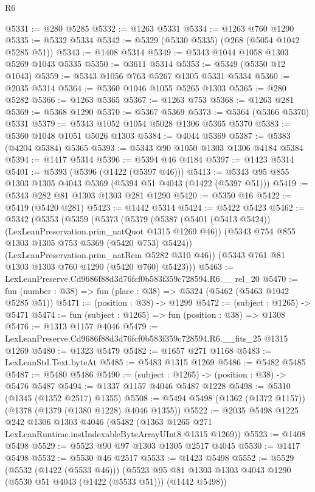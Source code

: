 \begin{lexlean}{R6}
\begin{coremodule}
@5331 := @280 @5285
@5332 := @1263 @5331
@5334 := @1263 @760 @1290
@5335 := @5332 @5334
@5342 := @5329 (@5330 @5335) (@268 (@5054 @1042 @5285 @51))
@5343 := @1408 @5314
@5349 := @5343 @1044 @1058 @1303 @5269 @1043 @5335
@5350 := @3611 @5314
@5353 := @5349 (@5350 @12 @1043)
@5359 := @5343 @1056 @763 @5267 @1305 @5331 @5334
@5360 := @2035 @5314
@5364 := @5360 @1046 @1055 @5265 @1303
@5365 := @280 @5282
@5366 := @1263 @5365
@5367 := @1263 @753
@5368 := @1263 @281
@5369 := @5368 @1290
@5370 := @5367 @5369
@5373 := @5364 (@5366 @5370) @5331
@5379 := @5343 @1052 @1054 @5028 @1306 @5365 @5370
@5383 := @5360 @1048 @1051 @5026 @1303
@5384 := @4044 @5369
@5387 := @5383 (@4204 @5384) @5365
@5393 := @5343 @90 @1050 @1303 @1306 @4184 @5384
@5394 := @1417 @5314
@5396 := @5394 @46 @4184
@5397 := @1423 @5314
@5401 := @5393 (@5396 (@1422 (@5397 @46)))
@5413 := @5343 @95 @855 @1303 @1305 @4043 @5369 (@5394 @51 @4043 (@1422 (@5397 @51)))
@5419 := @5343 @282 @81 @1303 @1303 @281 @1290
@5420 := @5350 @16
@5422 := @5419 (@5420 @281)
@5423 := @1442 @5314
@5424 := @5422 @5423
@5462 := @5342
    (@5353
      (@5359
        (@5373
          (@5379
            (@5387 (@5401 (@5413 @5424)) (LexLeanPreservation.prim_natQuot @1315 @1269 @46))
            (@5343 @754 @855 @1303 @1305 @753 @5369 (@5420 @753) @5424))
          (LexLeanPreservation.prim_natRem @5282 @310 @46))
        (@5343 @761 @81 @1303 @1303 @760 @1290 (@5420 @760) @5423)))
@5463 := LexLeanPreserve.Cd9686f88d3d76fcf0b583f359c728594.R6.__rel_20
@5470 := fun (number : @38) => fun (place : @38) => @5324 (@5462 (@5463 @1042 @5285 @51))
@5471 := (position : @38) -> @1299
@5472 := (subject : @1265) -> @5471
@5474 := fun (subject : @1265) => fun (position : @38) => @1308
@5476 := @1313 @1157 @4046
@5479 := LexLeanPreserve.Cd9686f88d3d76fcf0b583f359c728594.R6.__fits_25 @1315 @1269
@5480 := @1323 @5479
@5482 := @1657 @271 @1168
@5483 := LexLeanStd.Text.byteAt
@5485 := @5483 @1315 @1269
@5486 := @5482 @5485
@5487 := @5480 @5486
@5490 := (subject : @1265) -> (position : @38) -> @5476 @5487
@5494 := @1337 @1157 @4046 @5487 @1228
@5498 := @5310 (@1345 (@1352 @2517) @1355)
@5508 := @5494 @5498 (@1362 (@1372 @1157)) (@1378 (@1379 (@1380 @1228) @4046 @1355))
@5522 := @2035
    @5498
    @1225
    @242
    @1306
    @1303
    @4046
    (@5482 (@1363 @1265 @271 LexLeanRuntime.instIndexableByteArrayUInt8 @1315 @1269))
@5523 := @1408 @5498
@5529 := @5523 @90 @97 @1303 @1305 @2517 @4045
@5530 := @1417 @5498
@5532 := @5530 @46 @2517
@5533 := @1423 @5498
@5552 := @5529
    (@5532 (@1422 (@5533 @46)))
    (@5523 @95 @81 @1303 @1303 @4043 @1290 (@5530 @51 @4043 (@1422 (@5533 @51))) (@1442 @5498))

\end{coremodule}
\end{lexlean}
